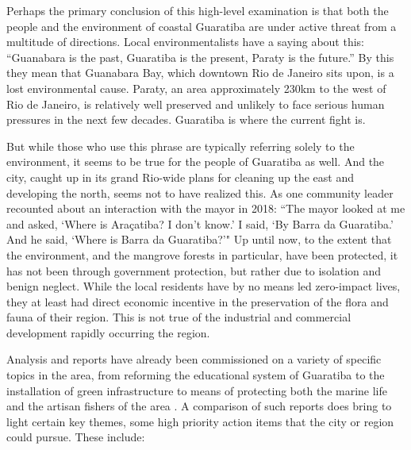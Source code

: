 Perhaps the primary conclusion of this high-level examination is that both the people and the environment of coastal Guaratiba are under active threat from a multitude of directions. Local environmentalists have a saying about this: “Guanabara is the past, Guaratiba is the present, Paraty is the future.” By this they mean that Guanabara Bay, which downtown Rio de Janeiro sits upon, is a lost environmental cause. Paraty, an area approximately 230km to the west of Rio de Janeiro, is relatively well preserved and unlikely to face serious human pressures in the next few decades. Guaratiba is where the current fight is. 

But while those who use this phrase are typically referring solely to the environment, it seems to be true for the people of Guaratiba as well. And the city, caught up in its grand Rio-wide plans for cleaning up the east and developing the north, seems not to have realized this. As one community leader recounted about an interaction with the mayor in 2018: ``The mayor looked at me and asked, `Where is Araçatiba? I don’t know.’ I said, `By Barra da Guaratiba.’ And he said, `Where is Barra da Guaratiba?'" \cite{stroblFollowingRecentEviction2018} Up until now, to the extent that the environment, and the mangrove forests in particular, have been protected, it has not been through government protection, but rather due to isolation and benign neglect. While the local residents have by no means led zero-impact lives, they at least had direct economic incentive in the preservation of the flora and fauna of their region. This is not true of the industrial and commercial development rapidly occurring the region.

Analysis and reports have already been commissioned on a variety of specific topics in the area, from reforming the educational system of Guaratiba \cite{pizzolatoLOCALIZACAOESCOLASPUBLICAS2013} to the installation of green infrastructure \cite{herzogGuaratibaVerdeSubsidios2009} to means of protecting both the marine life and the artisan fishers of the area \cite{lopesTerritorialidadesEmConflitos2013}. A comparison of such reports does bring to light certain key themes, some high priority action items that the city or region could pursue. These include:

